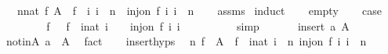 \begin{isabellebody}
\ \ \ {\isachardoublequoteopen}{\isasymexists}{\isacharparenleft}{\kern0pt}n{\isacharcolon}{\kern0pt}{\isacharcolon}{\kern0pt}nat{\isacharparenright}{\kern0pt}\ f{\isachardot}{\kern0pt}\ A\ {\isacharequal}{\kern0pt}\ f\ {\isacharbackquote}{\kern0pt}\ {\isacharbraceleft}{\kern0pt}i{\isachardot}{\kern0pt}\ i\ {\isacharless}{\kern0pt}\ n{\isacharbraceright}{\kern0pt}\ {\isasymand}\ inj{\isacharunderscore}{\kern0pt}on\ f\ {\isacharbraceleft}{\kern0pt}i{\isachardot}{\kern0pt}\ i\ {\isacharless}{\kern0pt}\ n{\isacharbraceright}{\kern0pt}{\isachardoublequoteclose}\isanewline
%
\isadelimproof
\ \ %
\endisadelimproof
%
\isatagproof
{}\isamarkupfalse%
\ assms\isanewline
{}\isamarkupfalse%
\ induct\isanewline
\ \ \isamarkupfalse%
\ empty\isanewline
\ \ \isamarkupfalse%
\ {\isacharquery}{\kern0pt}case\isanewline
\ \ \isamarkupfalse%
\isanewline
\ \ \ \ \isamarkupfalse%
\ {\isachardoublequoteopen}{\isasymexists}f{\isachardot}{\kern0pt}\ {\isacharbraceleft}{\kern0pt}{\isacharbraceright}{\kern0pt}\ {\isacharequal}{\kern0pt}\ f\ {\isacharbackquote}{\kern0pt}\ {\isacharbraceleft}{\kern0pt}i{\isacharcolon}{\kern0pt}{\isacharcolon}{\kern0pt}nat{\isachardot}{\kern0pt}\ i\ {\isacharless}{\kern0pt}\ {}{\isacharbraceright}{\kern0pt}\ {\isasymand}\ inj{\isacharunderscore}{\kern0pt}on\ f\ {\isacharbraceleft}{\kern0pt}i{\isachardot}{\kern0pt}\ i\ {\isacharless}{\kern0pt}\ {}{\isacharbraceright}{\kern0pt}{\isachardoublequoteclose}\isanewline
\ \ \ \ \ \ \isamarkupfalse%
\ simp\isanewline
\ \ \isamarkupfalse%
\isanewline
{}\isamarkupfalse%
\isanewline
\ \ \isamarkupfalse%
\ {\isacharparenleft}{\kern0pt}insert\ a\ A{\isacharparenright}{\kern0pt}\isanewline
\ \ \isamarkupfalse%
\ notinA{\isacharcolon}{\kern0pt}\ {\isachardoublequoteopen}a\ {\isasymnotin}\ A{\isachardoublequoteclose}\ \isamarkupfalse%
\ fact\isanewline
\ \ \isamarkupfalse%
\ insert{\isachardot}{\kern0pt}hyps\ \isamarkupfalse%
\ n\ f\ \ {\isachardoublequoteopen}A\ {\isacharequal}{\kern0pt}\ f\ {\isacharbackquote}{\kern0pt}\ {\isacharbraceleft}{\kern0pt}i{\isacharcolon}{\kern0pt}{\isacharcolon}{\kern0pt}nat{\isachardot}{\kern0pt}\ i\ {\isacharless}{\kern0pt}\ n{\isacharbraceright}{\kern0pt}{\isachardoublequoteclose}\ {\isachardoublequoteopen}inj{\isacharunderscore}{\kern0pt}on\ f\ {\isacharbraceleft}{\kern0pt}i{\isachardot}{\kern0pt}\ i\ {\isacharless}{\kern0pt}\ n{\isacharbraceright}{\kern0pt}{\isachardoublequoteclose}\isanewline

\end{isabellebody}
